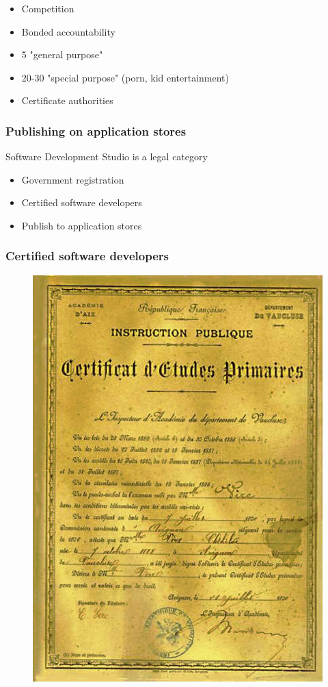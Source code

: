 \begin{itemize}
\item Competition
\item Bonded accountability
\item 5 "general purpose"
\item 20-30 "special purpose" (porn, kid entertainment)
\item Certificate authorities
\end{itemize}

\begin{frame}[fragile]
\frametitle{Publishing on application stores}

Software Development Studio is a legal category

\end{frame}

\begin{itemize}
\item Government registration
\item Certified software developers
\item Publish to application stores
\end{itemize}

\begin{frame}[fragile]
\frametitle{Certified software developers}


\begin{figure}
\includegraphics[scale=0.2]{certificate}
\end{figure}

\end{frame}

